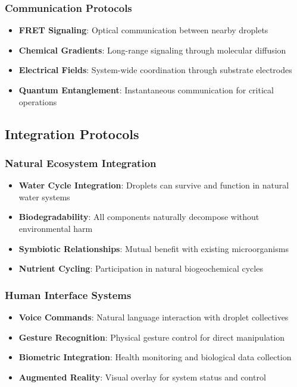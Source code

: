 \documentclass[11pt,a4paper]{article}
\begin{document}
\subsubsection{Communication Protocols}
\begin{itemize}
    \item \textbf{FRET Signaling}: Optical communication between nearby droplets
    \item \textbf{Chemical Gradients}: Long-range signaling through molecular diffusion
    \item \textbf{Electrical Fields}: System-wide coordination through substrate electrodes
    \item \textbf{Quantum Entanglement}: Instantaneous communication for critical operations
\end{itemize}

\subsection{Integration Protocols}

\subsubsection{Natural Ecosystem Integration}
\begin{itemize}
    \item \textbf{Water Cycle Integration}: Droplets can survive and function in natural water systems
    \item \textbf{Biodegradability}: All components naturally decompose without environmental harm
    \item \textbf{Symbiotic Relationships}: Mutual benefit with existing microorganisms
    \item \textbf{Nutrient Cycling}: Participation in natural biogeochemical cycles
\end{itemize}

\subsubsection{Human Interface Systems}
\begin{itemize}
    \item \textbf{Voice Commands}: Natural language interaction with droplet collectives
    \item \textbf{Gesture Recognition}: Physical gesture control for direct manipulation
    \item \textbf{Biometric Integration}: Health monitoring and biological data collection
    \item \textbf{Augmented Reality}: Visual overlay for system status and control
\end{itemize}
\end{document}
